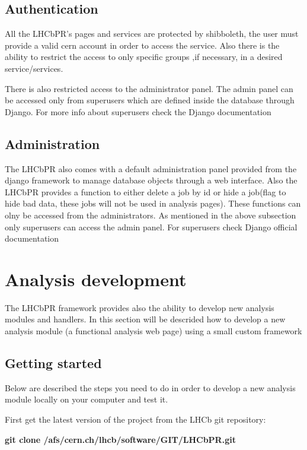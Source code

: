 \documentclass{lhcbnote}
\begin{document}
\subsection{Authentication}
All the LHCbPR's pages and services are protected by shibboleth, the user must provide a valid cern account in order to access the service.
Also there is the ability to restrict the access to only specific groups ,if necessary, in a desired service/services. 

There is also restricted access to the administrator panel. The admin panel can be accessed only from superusers which are defined inside the database through Django. 
For more info about superusers check the Django documentation

\subsection{Administration}
The LHCbPR also comes with a default administration panel provided from the django framework to manage database objects through a web interface. 
Also the LHCbPR provides a function to either delete a job by id or  hide a job(flag to hide bad data, these jobs will not be used in analysis pages). These 
functions can olny be accessed from the administrators. As mentioned in the above subsection only superusers can access the admin panel. 
For superusers check Django official documentation

\section{Analysis development}

The LHCbPR framework provides also the ability to develop new analysis modules and handlers. 
In this section will be descrided how to develop a new analysis module (a functional analysis web page) using a small custom framework 

\subsection{Getting started}

Below are described the steps you need to do in order to develop a new analysis module locally on your computer and test it. 

First get the latest version of the project from the LHCb git repository:

\vspace{2 mm}

{\bf git clone /afs/cern.ch/lhcb/software/GIT/LHCbPR.git}
\end{document}

